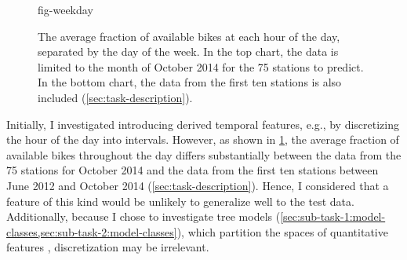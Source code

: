 \begin{figure}[!ht]
  \centering
  {fig-weekday}
  \caption{
    The average fraction of available bikes at each hour of the day, separated by the day of the week.
    In the top chart, the data is limited to the month of October 2014 for the 75 stations
    to predict.
    In the bottom chart, the data from the first ten stations is also included
    (\cref{sec:task-description}).
  }
  \label{fig-weekday}
\end{figure}

Initially, I investigated introducing derived temporal features, e.g., by discretizing
the hour of the day into intervals.
However, as shown in \cref{fig-weekday}, the average fraction of available bikes
throughout the day differs substantially between the data from the 75 stations for
October 2014 and the data from the first ten stations between June 2012 and October
2014 (\cref{sec:task-description}).
Hence, I considered that a feature of this kind would be unlikely to generalize well to
the test data.
Additionally, because I chose to investigate tree models
(\cref{sec:sub-task-1:model-classes,sec:sub-task-2:model-classes}), which partition the
spaces of quantitative features \parencite[155]{Flach2012}, discretization may be
irrelevant.
